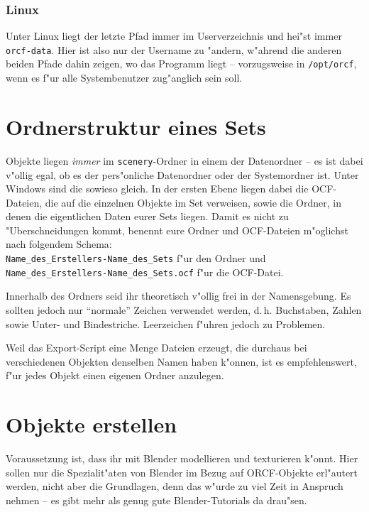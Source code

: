 \documentclass[a4paper]{article}
\newcommand{\cfile}[1]{\texttt{#1}}
\begin{document}
\subsubsection{Linux}
Unter Linux liegt der letzte Pfad immer im Userverzeichnis und hei"st immer \cfile{orcf-data}. Hier ist also nur der Username zu "andern, w"ahrend die
anderen beiden Pfade dahin zeigen, wo das Programm liegt -- vorzugsweise in \cfile{/opt/orcf}, wenn es f"ur alle Systembenutzer zug"anglich sein soll.


\section{Ordnerstruktur eines Sets}
\label{directories}
Objekte liegen \emph{immer} im \cfile{scenery}-Ordner in einem der Datenordner -- es ist dabei v"ollig egal, ob es der pers"onliche Datenordner oder der
Systemordner ist. Unter Windows sind die sowieso gleich. In der ersten Ebene liegen dabei die OCF-Dateien, die auf die einzelnen Objekte im Set
verweisen, sowie die Ordner, in denen die eigentlichen Daten eurer Sets liegen. Damit es nicht zu "Uberschneidungen kommt, benennt eure Ordner und
OCF-Dateien m"oglichst nach folgendem Schema:\\
\cfile{Name\_des\_Erstellers-Name\_des\_Sets} f"ur den Ordner und \\
\cfile{Name\_des\_Erstellers-Name\_des\_Sets.ocf} f"ur die OCF-Datei.

Innerhalb des Ordners seid ihr theoretisch v"ollig frei in der Namensgebung. Es sollten jedoch nur "`normale"' Zeichen verwendet werden, d.\,h.
Buchstaben, Zahlen sowie Unter- und Bindestriche. Leerzeichen f"uhren jedoch zu Problemen.

Weil das Export-Script eine Menge Dateien erzeugt, die durchaus bei verschiedenen Objekten denselben Namen haben k"onnen, ist es empfehlenswert, f"ur
jedes Objekt einen eigenen Ordner anzulegen.

\section{Objekte erstellen}
Voraussetzung ist, dass ihr mit Blender modellieren und texturieren k"onnt. Hier sollen nur die Spezialit"aten von Blender im Bezug auf ORCF-Objekte
erl"autert werden, nicht aber die Grundlagen, denn das w"urde zu viel Zeit in Anspruch nehmen -- es gibt mehr als genug gute Blender-Tutorials da
drau"sen.
\end{document}

